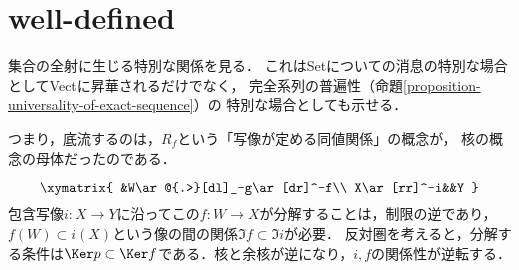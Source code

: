 \documentclass[uplatex, dvipdfmx]{jsreport}
\begin{document}
\section{well-defined}

\begin{tcolorbox}[colframe=ForestGreen, colback=ForestGreen!10!white, breakable]
    集合の全射に生じる特別な関係を見る．
    これはSetについての消息の特別な場合としてVectに昇華されるだけでなく，
    完全系列の普遍性（命題\ref{proposition-universality-of-exact-sequence}）の
    特別な場合としても示せる．

    つまり，底流するのは，$R_f$という「写像が定める同値関係」の概念が，
    核の概念の母体だったのである．
\end{tcolorbox}

\begin{discussion}[双対性で見る]
    \[\xymatrix{
        &W\ar@{.>}[dl]_-g\ar[dr]^-f\\
        X\ar[rr]^-i&&Y
    }\]
    包含写像$i:X\to Y$に沿ってこの$f:W\to X$が分解することは，制限の逆であり，$f(W)\subset i(X)$という像の間の関係$\Im f\subset \Im i$が必要．
    反対圏を考えると，分解する条件は$\Ker p\subset\Ker f$である．核と余核が逆になり，$i,f$の関係性が逆転する．
\end{discussion}
\end{document}
